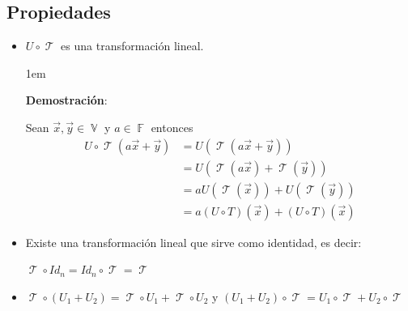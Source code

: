\documentclass[12pt, fleqn]{report}                             %
\newenvironment{SmallIndentation}[1][0.75em]                    %
        {\begin{adjustwidth}{#1}{}\begin{footnotesize}}             %
        {\end{footnotesize}\end{adjustwidth}}                       %
\theoremstyle{break}                                            %
\DeclareMathOperator \GenericField {\mathbb{F}}                 %
\DeclareMathOperator \VectorSet    {\mathbb{V}}                 %
\DeclareMathOperator \LinTrans      {\mathcal{T}}               %
\begin{document}
            \subsection{Propiedades}

                \begin{itemize}
                    \item 
                        $U \circ \LinTrans$ es una transformación lineal.

                        \begin{SmallIndentation}[1em]
                            \textbf{Demostración}:
                            
                            Sean $\vec x, \vec y \in \VectorSet$ y $a \in \GenericField$ entonces
                            \begin{align*}
                                U \circ \LinTrans(a\vec x + \vec y)
                                    &= U(\LinTrans(a\vec x + \vec y))                   \\
                                    &= U(\LinTrans(a\vec x) + \LinTrans(\vec y))        \\
                                    &= aU(\LinTrans(\vec x)) + U(\LinTrans(\vec y))     \\
                                    &= a (U \circ T)(\vec x) + (U \circ T)(\vec x)
                            \end{align*}
                        
                        \end{SmallIndentation}

                    \item 
                        Existe una transformación lineal que sirve como identidad, es decir:

                        $\LinTrans \circ Id_n = Id_n \circ \LinTrans = \LinTrans$

                    \item 
                        $\LinTrans \circ (U_1 + U_2) = \LinTrans \circ U_1 + \LinTrans \circ U_2$
                        y 
                        $(U_1 + U_2) \circ \LinTrans = U_1 \circ \LinTrans + U_2 \circ \LinTrans$


\end{itemize}
\end{document}

